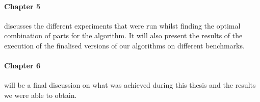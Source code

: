 \paragraph{Chapter 5}discusses the different experiments that were run whilst finding the optimal combination of parts for the algorithm. It will also present the results of the execution of the finalised versions of our algorithms on different benchmarks.

\paragraph{Chapter 6}will be a final discussion on what was achieved during this thesis and the results we were able to obtain.









